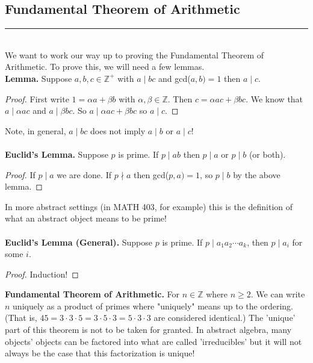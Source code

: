 \documentclass[class=article, crop=false]{standalone}
\def\integers{{\mathbb Z}}
\begin{document}
\subsection{Fundamental Theorem of Arithmetic}
\rule{\textwidth}{1pt}\\
We want to work our way up to proving the Fundamental Theorem of Arithmetic. To prove this, we will need a few
lemmas.\\
\textbf{Lemma.} Suppose $a,b,c\in\integers^+$ with $a\mid bc$ and gcd($a,b)=1$ then $a\mid c$.
\begin{proof}
	First write $1=\alpha a+\beta b$ with $\alpha,\beta\in\integers$. Then $c=\alpha ac+ \beta bc$. We know that
	$a\mid \alpha ac$ and $a\mid\beta bc$. So $a\mid\alpha ac+ \beta bc$ so $a\mid c$.
\end{proof}
\noindent Note, in general, $a\mid bc$ does not imply $a\mid b$ or $a\mid c$!\\\\
\textbf{Euclid's Lemma.} Suppose $p$ is prime. If $p\mid ab$ then $p\mid a$ or $p\mid b$ (or both).
\begin{proof}
	If $p\mid a$ we are done. If $p\nmid a$ then gcd($p,a)=1$, so $p\mid b$ by the above lemma.
\end{proof}
\noindent In more abstract settings (in MATH 403, for example) this is the definition of what an abstract object
means to be prime!\\\\
\textbf{Euclid's Lemma (General).} Suppose $p$ is prime. If $p\mid a_1a_2\cdots a_k$, then $p\mid a_i$ for some $i$.
\begin{proof}
	Induction!
\end{proof}
\noindent\textbf{Fundamental Theorem of Arithmetic.} For $n\in\integers$ where $n\geq 2$. We can write $n$ uniquely as a 
product of primes where "uniquely" means up to the ordering. (That is, $45=3\cdot 3\cdot5=3\cdot5\cdot3=5\cdot3\cdot3$ are
considered identical.) The 'unique' part of this theorem is not to be taken for granted. In abstract algebra, many objects'
objects can be factored into what are called 'irreducibles' but it will not always be the case that this factorization is unique!
\end{document}
